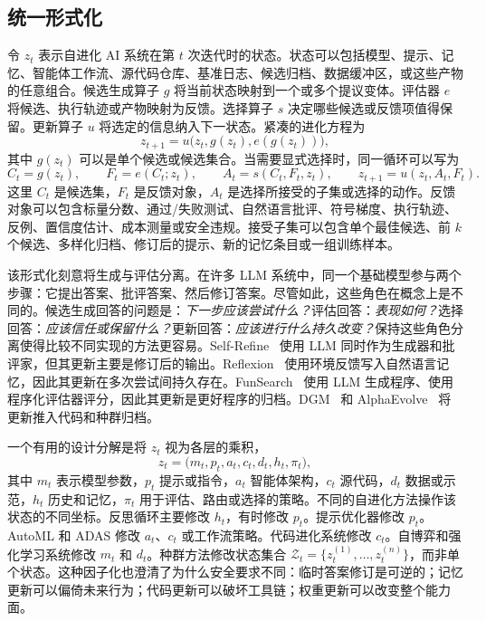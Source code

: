 \subsection{统一形式化}\label{sec:ch2-formalization}

令 $z_t$ 表示自进化 AI 系统在第 $t$ 次迭代时的状态。状态可以包括模型、提示、记忆、智能体工作流、源代码仓库、基准日志、候选归档、数据缓冲区，或这些产物的任意组合。候选生成算子 $g$ 将当前状态映射到一个或多个提议变体。评估器 $e$ 将候选、执行轨迹或产物映射为反馈。选择算子 $s$ 决定哪些候选或反馈项值得保留。更新算子 $u$ 将选定的信息纳入下一状态。紧凑的进化方程为
\begin{equation}\label{eq:ch2-general-evolution}
  z_{t+1} = u\bigl(z_t, g(z_t), e(g(z_t))\bigr),
\end{equation}
其中 $g(z_t)$ 可以是单个候选或候选集合。当需要显式选择时，同一循环可以写为
\begin{equation}\label{eq:ch2-expanded-evolution}
  C_t = g(z_t), \qquad F_t = e(C_t; z_t), \qquad A_t = s(C_t, F_t, z_t), \qquad z_{t+1}=u(z_t,A_t,F_t).
\end{equation}
这里 $C_t$ 是候选集，$F_t$ 是反馈对象，$A_t$ 是选择所接受的子集或选择的动作。反馈对象可以包含标量分数、通过/失败测试、自然语言批评、符号梯度、执行轨迹、反例、置信度估计、成本测量或安全违规。接受子集可以包含单个最佳候选、前 $k$ 个候选、多样化归档、修订后的提示、新的记忆条目或一组训练样本。

该形式化刻意将生成与评估分离。在许多 LLM 系统中，同一个基础模型参与两个步骤：它提出答案、批评答案、然后修订答案。尽管如此，这些角色在概念上是不同的。候选生成回答的问题是：\emph{下一步应该尝试什么？}评估回答：\emph{表现如何？}选择回答：\emph{应该信任或保留什么？}更新回答：\emph{应该进行什么持久改变？}保持这些角色分离使得比较不同实现的方法更容易。Self-Refine~\cite{selfrefine2023} 使用 LLM 同时作为生成器和批评家，但其更新主要是修订后的输出。Reflexion~\cite{reflexion2023} 使用环境反馈写入自然语言记忆，因此其更新在多次尝试间持久存在。FunSearch~\cite{funsearch2024} 使用 LLM 生成程序、使用程序化评估器评分，因此其更新是更好程序的归档。DGM~\cite{darwingodelmachine2025} 和 AlphaEvolve~\cite{alphaevolve2025} 将更新推入代码和种群归档。

一个有用的设计分解是将 $z_t$ 视为各层的乘积，
\begin{equation}\label{eq:ch2-state-factorization}
  z_t = \bigl(m_t, p_t, a_t, c_t, d_t, h_t, \pi_t\bigr),
\end{equation}
其中 $m_t$ 表示模型参数，$p_t$ 提示或指令，$a_t$ 智能体架构，$c_t$ 源代码，$d_t$ 数据或示范，$h_t$ 历史和记忆，$\pi_t$ 用于评估、路由或选择的策略。不同的自进化方法操作该状态的不同坐标。反思循环主要修改 $h_t$，有时修改 $p_t$。提示优化器修改 $p_t$。AutoML 和 ADAS 修改 $a_t$、$c_t$ 或工作流策略。代码进化系统修改 $c_t$。自博弈和强化学习系统修改 $m_t$ 和 $d_t$。种群方法修改状态集合 $\mathcal{Z}_t = \{z_t^{(1)},\ldots,z_t^{(n)}\}$，而非单个状态。这种因子化也澄清了为什么安全要求不同：临时答案修订是可逆的；记忆更新可以偏倚未来行为；代码更新可以破坏工具链；权重更新可以改变整个能力面。

